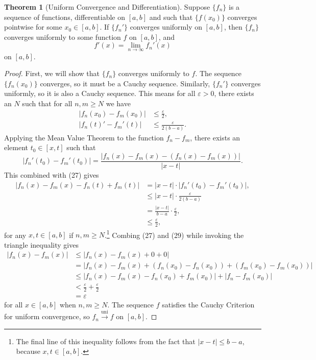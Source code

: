 \documentclass{article}
\newcommand{\uni}{\overset{\text{uni}}{\to}}
\theoremstyle{definition}
\newtheorem{theorem}{Theorem}[section]
\begin{document}
\begin{theorem}[Uniform Convergence and Differentiation]
Suppose $ \{f_n\} $ is a sequence of functions, differentiable on $ [a,b] $ and such that $ \{f(x_0)\} $ converges pointwise for some $ x_0\in[a,b] $. If $ \{f_n'\} $ converges uniformly on $ [a,b] $, then $ \{f_n\} $ converges uniformly to some function $ f $ on $ [a,b] $, and $$f'(x)=\lim\limits_{n\to\infty}f_n'(x) $$ on $ [a,b] $. 
\end{theorem}
\begin{proof}
First, we will show that $ \{f_n\} $ converges uniformly to $ f $. The sequence $ \{f_n(x_0)\} $ converges, so it must be a Cauchy sequence. Similarly, $ \{f_n'\} $ converges uniformly, so it is also a Cauchy sequence. This means for all $ \varepsilon>0 $, there exists an $ N $ such that for all $ n,m\ge N $ we have \begin{align}
	|f_n(x_0)-f_m(x_0)|&\le \frac{\varepsilon}{2},\\|f_n(t)'-f_m'(t)|&\le \frac{\varepsilon}{2(b-a)}.
\end{align}
Applying the Mean Value Theorem to the function $ f_n-f_m $, there exists an element $ t_0\in[x,t] $ such that $$ |f_n'(t_0) - f_m'(t_0)|=\frac{|f_n(x)-f_m(x)-(f_n(x)-f_m(x))| }{|x-t|}.$$
This combined with (27) gives 
\begin{align}
	|f_n(x)-f_m(x)-f_n(t)+f_m(t)| &=|x-t|\cdot|f_n'(t_0) - f_m'(t_0)|,\nonumber\\&\le |x-t|\cdot \frac{\varepsilon}{2(b-a)}\\&=\frac{|x-t|}{b-a}\cdot\frac{\varepsilon}{2},\nonumber\\&\le \frac{\varepsilon}{2},
\end{align}
for any $ x,t\in[a,b] $ if $ n,m\ge N $.\footnote{The final line of this inequality follows from the fact that $ |x-t|\le b-a $, because $ x,t\in[a,b] $. } Combing (27) and (29)  while invoking the triangle inequality gives \begin{align*}
|f_n(x)-f_m(x)|&\le |f_n(x)-f_m(x) + 0 + 0|\\&=|f_n(x)-f_m(x) + (f_n(x_0)-f_n(x_0)) + (f_m(x_0)-f_m(x_0))|\\&\le 	|f_n(x)-f_m(x)-f_n(x_0)+f_m(x_0)| + |f_n-f_m(x_0)| \\&<\frac{\varepsilon}{2}+\frac{\varepsilon}{2}\\&=\varepsilon
\end{align*}
for all $ x\in[a,b] $ when $ n,m\ge N $. The sequence $ f $ satisfies the Cauchy Criterion for uniform convergence, so $ f_n\uni f $ on $ [a,b] $. 


\end{proof}
\end{document}
